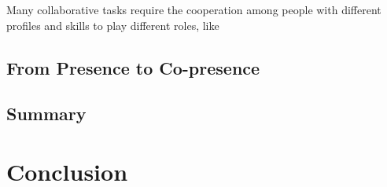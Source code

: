 Many collaborative tasks require the cooperation among people with different profiles and skills to play different roles, like 

\citep{Pouliquen2014Role, }

\citep{Narayan2005Quantifying, Nam2008Roles, Oguz2010Haptic}



\subsection{From Presence to Co-presence}



\subsection{Summary}


\section{Conclusion}

